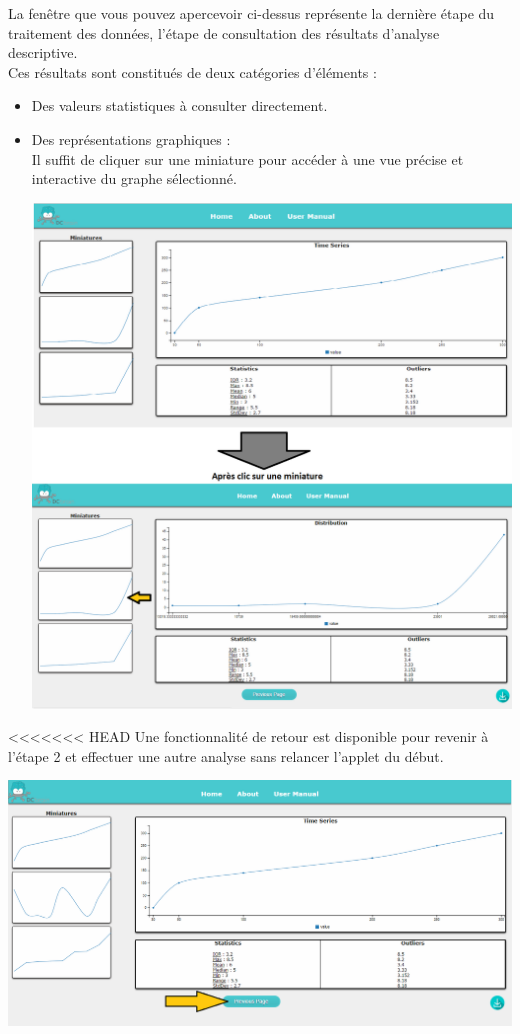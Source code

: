 		La fenêtre que vous pouvez apercevoir ci-dessus représente la dernière étape du traitement des données, l'étape de consultation des résultats d'analyse descriptive.\\
		Ces résultats sont constitués de deux catégories d'éléments :
		\begin{itemize}
			\item Des valeurs statistiques à consulter directement.
			\item Des représentations graphiques :\\
				Il suffit de cliquer sur une miniature pour accéder à une vue précise et interactive du graphe sélectionné.\\
			\begin{center}\includegraphics[scale=0.40]{fenetre3-2.png}\end{center}		
		\end{itemize}
<<<<<<< HEAD
		Une fonctionnalité de retour est disponible pour revenir à l'étape 2 et effectuer une autre analyse sans relancer l'applet du début.\\
			\begin{center}\includegraphics[scale=0.40]{fenetre3prec.png}\end{center}
